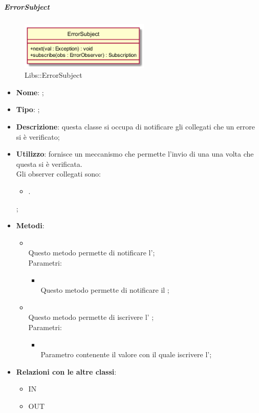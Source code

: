 \hypertarget{ErrorSubject_label}{\subparagraph{ErrorSubject}}
\begin{figure}[h]
	\centering
	\includegraphics[width=0.55\textwidth,height=\textheight,keepaspectratio]{images/ClassErrorSubject.png}
	\caption{Libs::ErrorSubject}
\end{figure}
\begin{itemize}
	\item \textbf{Nome}: ;
	\item \textbf{Tipo}: ;
	\item \textbf{Descrizione}: questa classe si occupa di notificare gli  collegati che un errore si è verificato;
	\item \textbf{Utilizzo}: fornisce un meccanismo che permette l'invio di una  una volta che questa si è verificata.\\
	Gli observer collegati sono:
	\begin{itemize}
		\item {}.
	\end{itemize};
	\item \textbf{Metodi}:
	\begin{itemize}
		\item[]  \\		Questo metodo permette di notificare l';\\
		Parametri:
		\begin{itemize}
			\item {} \\
			Questo metodo permette di notificare il ;
		\end{itemize}
		\item[]  \\			Questo metodo permette di iscrivere l' ;\\
		Parametri:
		\begin{itemize}
			\item {} \\
			Parametro contenente il valore con il quale iscrivere l';
		\end{itemize}
	\end{itemize}
	\item \textbf{Relazioni con le altre classi}:
	\begin{itemize}
		\item IN \hyperlink{Exception_label}{}
		\item OUT \hyperlink{ErrorObserver_label}{}
	\end{itemize}
\end{itemize}
\FloatBarrier


